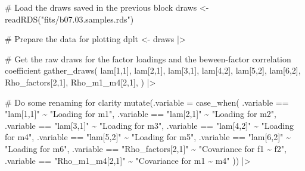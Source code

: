 \documentclass[
  letterpaper,
  DIV=11,
  numbers=noendperiod]{scrreprt}
\newenvironment{Shaded}{\begin{snugshade}}{\end{snugshade}}
\newcommand{\AttributeTok}[1]{\textcolor[rgb]{0.40,0.45,0.13}{#1}}
\newcommand{\CommentTok}[1]{\textcolor[rgb]{0.37,0.37,0.37}{#1}}
\newcommand{\FunctionTok}[1]{\textcolor[rgb]{0.28,0.35,0.67}{#1}}
\newcommand{\NormalTok}[1]{\textcolor[rgb]{0.00,0.23,0.31}{#1}}
\newcommand{\OtherTok}[1]{\textcolor[rgb]{0.00,0.23,0.31}{#1}}
\newcommand{\SpecialCharTok}[1]{\textcolor[rgb]{0.37,0.37,0.37}{#1}}
\newcommand{\StringTok}[1]{\textcolor[rgb]{0.13,0.47,0.30}{#1}}
\begin{document}
\begin{Shaded}
\begin{Highlighting}[]
\CommentTok{\# Load the draws saved in the previous block}
\NormalTok{draws }\OtherTok{\textless{}{-}} \FunctionTok{readRDS}\NormalTok{(}\StringTok{"fits/b07.03.samples.rds"}\NormalTok{)}

\CommentTok{\# Prepare the data for plotting}
\NormalTok{dplt }\OtherTok{\textless{}{-}}\NormalTok{ draws }\SpecialCharTok{|\textgreater{}}

  \CommentTok{\# Get the raw draws for the factor loadings and the beween{-}factor correlation coefficient}
  \FunctionTok{gather\_draws}\NormalTok{(}
   \StringTok{\textasciigrave{}}\AttributeTok{lam[1,1]}\StringTok{\textasciigrave{}}\NormalTok{,}
   \StringTok{\textasciigrave{}}\AttributeTok{lam[2,1]}\StringTok{\textasciigrave{}}\NormalTok{,}
   \StringTok{\textasciigrave{}}\AttributeTok{lam[3,1]}\StringTok{\textasciigrave{}}\NormalTok{,}
   \StringTok{\textasciigrave{}}\AttributeTok{lam[4,2]}\StringTok{\textasciigrave{}}\NormalTok{,}
   \StringTok{\textasciigrave{}}\AttributeTok{lam[5,2]}\StringTok{\textasciigrave{}}\NormalTok{,}
   \StringTok{\textasciigrave{}}\AttributeTok{lam[6,2]}\StringTok{\textasciigrave{}}\NormalTok{,}
   \StringTok{\textasciigrave{}}\AttributeTok{Rho\_factors[2,1]}\StringTok{\textasciigrave{}}\NormalTok{,}
   \StringTok{\textasciigrave{}}\AttributeTok{Rho\_m1\_m4[2,1]}\StringTok{\textasciigrave{}}\NormalTok{,}
\NormalTok{  ) }\SpecialCharTok{|\textgreater{}}

  \CommentTok{\# Do some renaming for clarity}
  \FunctionTok{mutate}\NormalTok{(}\AttributeTok{.variable =} \FunctionTok{case\_when}\NormalTok{(}
\NormalTok{    .variable }\SpecialCharTok{==} \StringTok{"lam[1,1]"} \SpecialCharTok{\textasciitilde{}} \StringTok{"Loading for m1"}\NormalTok{,}
\NormalTok{    .variable }\SpecialCharTok{==} \StringTok{"lam[2,1]"} \SpecialCharTok{\textasciitilde{}} \StringTok{"Loading for m2"}\NormalTok{,}
\NormalTok{    .variable }\SpecialCharTok{==} \StringTok{"lam[3,1]"} \SpecialCharTok{\textasciitilde{}} \StringTok{"Loading for m3"}\NormalTok{,}
\NormalTok{    .variable }\SpecialCharTok{==} \StringTok{"lam[4,2]"} \SpecialCharTok{\textasciitilde{}} \StringTok{"Loading for m4"}\NormalTok{,}
\NormalTok{    .variable }\SpecialCharTok{==} \StringTok{"lam[5,2]"} \SpecialCharTok{\textasciitilde{}} \StringTok{"Loading for m5"}\NormalTok{,}
\NormalTok{    .variable }\SpecialCharTok{==} \StringTok{"lam[6,2]"} \SpecialCharTok{\textasciitilde{}} \StringTok{"Loading for m6"}\NormalTok{,}
\NormalTok{    .variable }\SpecialCharTok{==} \StringTok{"Rho\_factors[2,1]"} \SpecialCharTok{\textasciitilde{}} \StringTok{"Covariance for f1 \textasciitilde{} f2"}\NormalTok{,}
\NormalTok{    .variable }\SpecialCharTok{==} \StringTok{"Rho\_m1\_m4[2,1]"} \SpecialCharTok{\textasciitilde{}} \StringTok{"Covariance for m1 \textasciitilde{} m4"}
\NormalTok{  )) }\SpecialCharTok{|\textgreater{}}


\end{Highlighting}
\end{Shaded}
\end{document}
